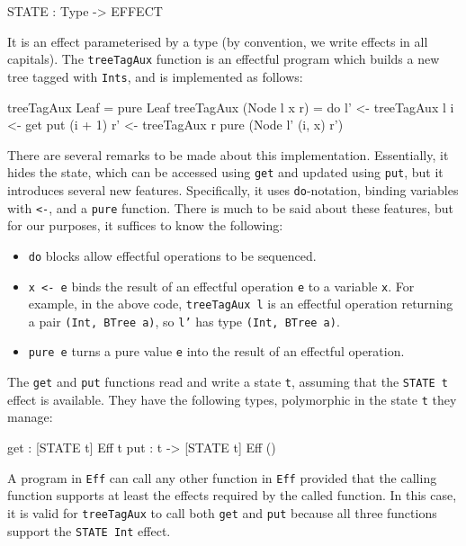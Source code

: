 \begin{code}
STATE : Type -> EFFECT
\end{code}

\noindent
It is an effect parameterised by a type (by convention, we write
effects in all capitals).
The \texttt{treeTagAux} function is an effectful program
which builds a new tree tagged with \texttt{Ints}, and is implemented as
follows:

\begin{code}
treeTagAux Leaf = pure Leaf
treeTagAux (Node l x r)
    = do l' <- treeTagAux l
         i <- get
         put (i + 1)
         r' <- treeTagAux r
         pure (Node l' (i, x) r')
\end{code}

\noindent
There are several remarks to be made about this implementation. Essentially,
it hides the state, which can be accessed using \texttt{get} and updated using
\texttt{put}, but it introduces several new features. Specifically, it uses
\texttt{do}-notation, binding variables with \texttt{<-}, and a
\texttt{pure} function. There is much to be said about these features, but
for our purposes, it suffices to know the following:

\begin{itemize}
\item \texttt{do} blocks allow effectful operations to be sequenced.
\item \texttt{x <- e} binds the result of an effectful operation \texttt{e} to
a variable \texttt{x}. For example, in the above code, \texttt{treeTagAux l}
is an effectful operation returning a pair \texttt{(Int, BTree a)}, so
\texttt{l'} has type \texttt{(Int, BTree a)}.
\item \texttt{pure e} turns a pure value \texttt{e} into the result of
an effectful operation.
\end{itemize}

\noindent
The \texttt{get} and \texttt{put} functions read and write a state \texttt{t},
assuming that the \texttt{STATE t} effect is available. They have the following
types, polymorphic in the state \texttt{t} they manage:

\begin{code}
get :      { [STATE t] } Eff t
put : t -> { [STATE t] } Eff ()
\end{code}

\noindent
A program in \texttt{Eff} can call any other function in \texttt{Eff} provided
that the calling function supports at least the effects required by the called
function. In this case, it is valid for \texttt{treeTagAux} to call both
\texttt{get} and \texttt{put} because all three functions support the
\texttt{STATE Int} effect.

